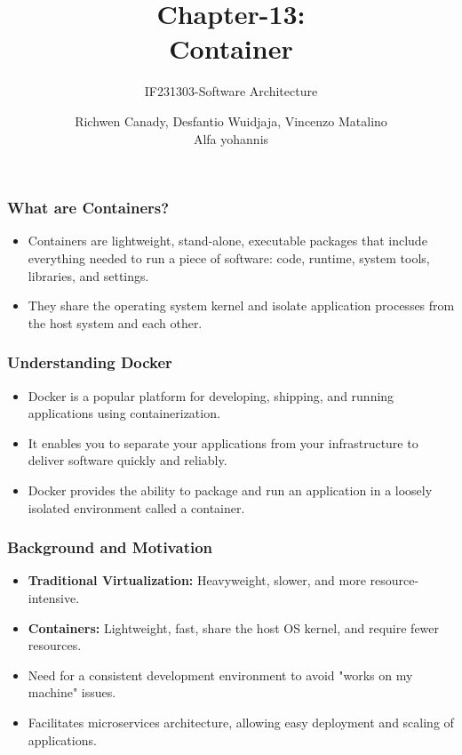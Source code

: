 \documentclass[aspectratio=169, table]{beamer}
\title{\huge Chapter-13:\\Container\vspace{10pt}}
\subtitle{IF231303-Software Architecture}
\author{Richwen Canady, Desfantio Wuidjaja, Vincenzo Matalino\\Alfa yohannis}
\begin{document}
    \begin{frame}[plain]
        \maketitle
    \end{frame}

    \begin{frame}
        \frametitle{What are Containers?}
        \begin{itemize}
            \item Containers are lightweight, stand-alone, executable packages that include everything needed to run a piece of software: code, runtime, system tools, libraries, and settings.
            \item They share the operating system kernel and isolate application processes from the host system and each other.
        \end{itemize}
    \end{frame}

    \begin{frame}
        \frametitle{Understanding Docker}
        \begin{itemize}
            \item Docker is a popular platform for developing, shipping, and running applications using containerization.
            \item It enables you to separate your applications from your infrastructure to deliver software quickly and reliably.
            \item Docker provides the ability to package and run an application in a loosely isolated environment called a container.
        \end{itemize}
    \end{frame}


    \begin{frame}
        \frametitle{Background and Motivation}
        \begin{itemize}
            \item \textbf{Traditional Virtualization:} Heavyweight, slower, and more resource-intensive.
            \item \textbf{Containers:} Lightweight, fast, share the host OS kernel, and require fewer resources.
            \item Need for a consistent development environment to avoid "works on my machine" issues.
            \item Facilitates microservices architecture, allowing easy deployment and scaling of applications.
        \end{itemize}
    \end{frame}
\end{document}
